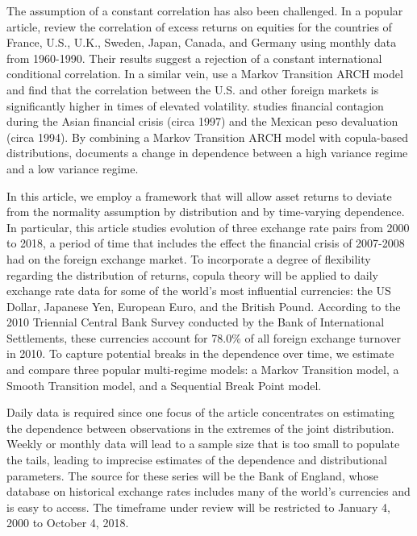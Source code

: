 \documentclass[12pt]{article}
\begin{document}
The assumption of a constant correlation has also been challenged. In a popular article, \cite{Longin_and_Solnik_1995} review the correlation of excess returns on equities for the countries of France, U.S., U.K., Sweden, Japan, Canada, and Germany using monthly data from 1960-1990. Their results suggest a rejection of a constant international conditional correlation. In a similar vein, \cite{Ramchand_and_Susmel_1998} use a Markov Transition ARCH model and find that the correlation between the U.S. and other foreign markets is significantly higher in times of elevated volatility. \cite{Rodriguez_2007} studies financial contagion during the Asian financial crisis (circa 1997) and the Mexican peso devaluation (circa 1994). By combining a Markov Transition ARCH model with copula-based distributions, \cite{Rodriguez_2007} documents a change in dependence between a high variance regime and a low variance regime.

In this article, we employ a framework that will allow asset returns to deviate from the normality assumption by distribution and by time-varying dependence. In particular, this article studies evolution of three exchange rate pairs from 2000 to 2018, a period of time that includes the effect the financial crisis of 2007-2008 had on the foreign exchange market. To incorporate a degree of flexibility regarding the distribution of returns, copula theory will be applied to daily exchange rate data for some of the world's most influential currencies: the US Dollar, Japanese Yen, European Euro, and the British Pound. According to the 2010 Triennial Central Bank Survey conducted by the Bank of International Settlements, these currencies account for 78.0\% of all foreign exchange turnover in 2010. To capture potential breaks in the dependence over time, we estimate and compare three popular multi-regime models: a Markov Transition model, a Smooth Transition model, and a Sequential Break Point model.

Daily data is required since one focus of the article concentrates on estimating the dependence between observations in the extremes of the joint distribution. Weekly or monthly data will lead to a sample size that is too small to populate the tails, leading to imprecise estimates of the dependence and distributional parameters. The source for these series will be the Bank of England, whose database on historical exchange rates includes many of the world's currencies and is easy to access. The timeframe under review will be restricted to January 4, 2000 to October 4, 2018.
\end{document}
